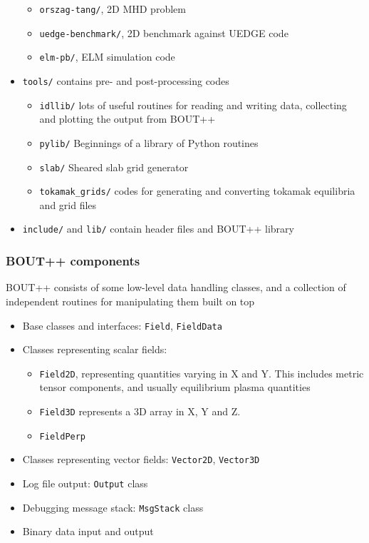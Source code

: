 \documentclass{beamer}
\begin{document}
\begin{frame}
\begin{itemize}
{\begin{itemize}
      \item \texttt{orszag-tang/}, 2D MHD problem
      \item \texttt{uedge-benchmark/}, 2D benchmark against UEDGE code
      \item \texttt{elm-pb/}, ELM simulation code
      \end{itemize}
    }
  \item<4-> \texttt{tools/}  contains pre- and post-processing codes
     {
      \begin{itemize}
      \item \texttt{idllib/}  lots of useful routines for reading and writing data, collecting and plotting the output from BOUT++
      \item \texttt{pylib/}  Beginnings of a library of Python routines
      \item \texttt{slab/}  Sheared slab grid generator
      \item \texttt{tokamak\_grids/}  codes for generating and converting
	tokamak equilibria and grid files
      \end{itemize}
    }
  \item<5-> \texttt{include/} and \texttt{lib/} contain header files and BOUT++ library
  \end{itemize}
  
\end{frame}

\begin{frame}
  \frametitle{BOUT++ components}
  BOUT++ consists of some low-level data handling classes, and 
  a collection of independent routines for manipulating them built on top
  
  \begin{itemize}
  \item Base classes and interfaces: \texttt{Field}, \texttt{FieldData}
  \item Classes representing scalar fields: 
    \begin{itemize}
    \item \texttt{Field2D}, representing quantities varying in X and Y. This includes metric tensor components, and usually equilibrium plasma quantities
    \item \texttt{Field3D} represents a 3D array in X, Y and Z.
    \item \texttt{FieldPerp}
    \end{itemize}
  \item Classes representing vector fields: \texttt{Vector2D}, \texttt{Vector3D}
  \item Log file output: \texttt{Output} class
  \item Debugging message stack: \texttt{MsgStack} class
  \item Binary data input and output 
  \end{itemize}
  
\end{frame}
\end{document}
